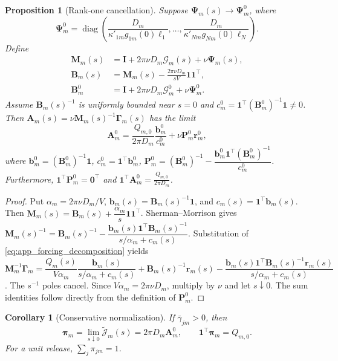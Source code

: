 \documentclass[pdflatex,sn-mathphys-num]{sn-jnl}
\numberwithin{equation}{section}
\theoremstyle{thmstyleone}%
\newtheorem{proposition}[theorem]{Proposition}
\newtheorem{corollary}[theorem]{Corollary}
\theoremstyle{definition}
\theoremstyle{remark}
\begin{document}
\begin{appendices}
\begin{proposition}[Rank-one cancellation]
\label{prop:app_rank_one_cancellation}
Suppose $\bm\Psi_m(s)\to\bm\Psi_m^0$, where
\[
\bm\Psi_m^0=\operatorname{diag}\!\left(
\frac{D_m}{\kappa'_{1m}g_{1m}(0)\ell_1},\ldots,
\frac{D_m}{\kappa'_{Nm}g_{Nm}(0)\ell_N}\right).
\]
Define
\begin{align*}
\mathbf M_m(s)&=\mathbf I+2\pi\nu D_m\bm{\mathcal G}_m(s)
+\nu\bm\Psi_m(s), \\
\mathbf B_m(s)&=\mathbf M_m(s)
-\frac{2\pi\nu D_m}{sV}\mathbf1\mathbf1^\top, \\
\mathbf B_m^0&=\mathbf I+2\pi\nu D_m\bm{\mathcal G}_m^0
+\nu\bm\Psi_m^0. 
\end{align*}
Assume $\mathbf B_m(s)^{-1}$ is uniformly bounded near $s=0$ and
$c_m^0=\mathbf1^\top(\mathbf B_m^0)^{-1}\mathbf1\ne0$. Then
$\mathbf A_m(s)=\nu\mathbf M_m(s)^{-1}\bm\Gamma_m(s)$ has the limit
\[
\mathbf A_m^0=\frac{Q_{m,0}}{2\pi D_m}
\frac{\mathbf b_m^0}{c_m^0}+\nu\mathbf P_m^0\bm r_m^0,
\]
where
$\mathbf b_m^0=(\mathbf B_m^0)^{-1}\mathbf1$, $c_m^0=\mathbf1^\top\mathbf b_m^0$,
$\mathbf P_m^0=(\mathbf B_m^0)^{-1}
-\dfrac{\mathbf b_m^0\mathbf1^\top(\mathbf B_m^0)^{-1}}{c_m^0}$.
Furthermore,
$\mathbf1^\top\mathbf P_m^0=\mathbf0^\top$ and
$\mathbf1^\top\mathbf A_m^0=\frac{Q_{m,0}}{2\pi D_m}$.
\end{proposition}

\begin{proof}
Put $\alpha_m=2\pi\nu D_m/V$,
$\mathbf b_m(s)=\mathbf B_m(s)^{-1}\mathbf1$, and
$c_m(s)=\mathbf1^\top\mathbf b_m(s)$. Then
$\mathbf M_m(s)=\mathbf B_m(s)+\dfrac{\alpha_m}{s}\mathbf1\mathbf1^\top$.
Sherman--Morrison gives
$\mathbf M_m(s)^{-1}=\mathbf B_m(s)^{-1}
-\dfrac{\mathbf b_m(s)\mathbf1^\top\mathbf B_m(s)^{-1}}
{s/\alpha_m+c_m(s)}$.
Substitution of \eqref{eq:app_forcing_decomposition} yields
$\mathbf M_m^{-1}\bm\Gamma_m =\dfrac{Q_m(s)}{V\alpha_m}
\dfrac{\mathbf b_m(s)}{s/\alpha_m+c_m(s)}
+\mathbf B_m(s)^{-1}\bm r_m(s) -\dfrac{\mathbf b_m(s)\mathbf1^\top
\mathbf B_m(s)^{-1}\bm r_m(s)}{s/\alpha_m+c_m(s)}$.
The $s^{-1}$ poles cancel. Since $V\alpha_m=2\pi\nu D_m$, multiply by
$\nu$ and let $s\downarrow0$. The sum identities follow directly from the
definition of $\mathbf P_m^0$.
\end{proof}

\begin{corollary}[Conservative normalization]
\label{cor:app_conservative_normalization}
If $\bar\gamma_{jm}>0$, then
\[
\bm\pi_m=\lim_{s\downarrow0}\widetilde{\bm{\mathcal J}}_m(s)
=2\pi D_m\mathbf A_m^0,
\qquad
\mathbf1^\top\bm\pi_m=Q_{m,0}.
\]
For a unit release, $\sum_j\pi_{jm}=1$.
\end{corollary}


\end{appendices}
\end{document}
